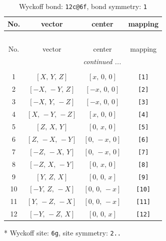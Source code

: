 \documentclass[fleqn,8pt]{jsarticle}
\begin{document}
\renewcommand{\arraystretch}{1.2}
\begin{longtable}{cccc}
\caption{Wyckoff bond: {\tt 12c@6f}, bond symmetry: {\tt 1}}
 \\
 \hline \hline
No. & vector & center & mapping \\ \hline \endfirsthead

\multicolumn{3}{l}{\tablename\ \thetable{}} \\
 \hline \hline
No. & vector & center & mapping \\ \hline \endhead

 \hline \hline
\multicolumn{3}{r}{\footnotesize\it continued ...} \\ \endfoot

 \hline \hline
\multicolumn{3}{r}{} \\ \endlastfoot

1 & $\left[ X,\, Y,\, Z \right]$ & $\left[ x,\, 0,\, 0 \right]$ & {\tt [1]} \\ \hline
2 & $\left[ - X,\, - Y,\, Z \right]$ & $\left[ - x,\, 0,\, 0 \right]$ & {\tt [2]} \\ \hline
3 & $\left[ - X,\, Y,\, - Z \right]$ & $\left[ - x,\, 0,\, 0 \right]$ & {\tt [3]} \\ \hline
4 & $\left[ X,\, - Y,\, - Z \right]$ & $\left[ x,\, 0,\, 0 \right]$ & {\tt [4]} \\ \hline
5 & $\left[ Z,\, X,\, Y \right]$ & $\left[ 0,\, x,\, 0 \right]$ & {\tt [5]} \\ \hline
6 & $\left[ Z,\, - X,\, - Y \right]$ & $\left[ 0,\, - x,\, 0 \right]$ & {\tt [6]} \\ \hline
7 & $\left[ - Z,\, - X,\, Y \right]$ & $\left[ 0,\, - x,\, 0 \right]$ & {\tt [7]} \\ \hline
8 & $\left[ - Z,\, X,\, - Y \right]$ & $\left[ 0,\, x,\, 0 \right]$ & {\tt [8]} \\ \hline
9 & $\left[ Y,\, Z,\, X \right]$ & $\left[ 0,\, 0,\, x \right]$ & {\tt [9]} \\ \hline
10 & $\left[ - Y,\, Z,\, - X \right]$ & $\left[ 0,\, 0,\, - x \right]$ & {\tt [10]} \\ \hline
11 & $\left[ Y,\, - Z,\, - X \right]$ & $\left[ 0,\, 0,\, - x \right]$ & {\tt [11]} \\ \hline
12 & $\left[ - Y,\, - Z,\, X \right]$ & $\left[ 0,\, 0,\, x \right]$ & {\tt [12]} \\
\end{longtable}
* Wyckoff site: {\tt 6g}, site symmetry: {\tt 2..}
\renewcommand{\arraystretch}{1.2}
\end{document}
